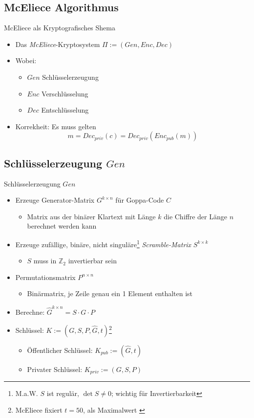 \documentclass[11pt%
,aspectratio=169%
]{beamer}
\begin{document}
\subsection{McEliece Algorithmus}
\begin{frame}{McEliece als Kryptografisches Shema}
    \begin{itemize}
        \item Das \emph{McEliece}-Kryptosystem $\Pi := (Gen, Enc, Dec)$
        \item Wobei:
        \begin{itemize}
            \item $Gen$ Schlüsselerzeugung
            \item $Enc$ Verschlüsselung
            \item $Dec$ Entschlüsselung
        \end{itemize}
        \item Korrekheit: Es muss gelten
        $$
            m = Dec_{priv}(c) = Dec_{priv} (Enc_{pub}(m))
        $$
    \end{itemize}
\end{frame}

\subsection{Schlüsselerzeugung $Gen$}
\begin{frame}{Schlüsselerzeugung $Gen$}
\begin{itemize}
    \item Erzeuge Generator-Matrix $G^{k \times n}$  für Goppa-Code $C$
    \begin{itemize}
        \item Matrix aus der binärer Klartext mit Länge $k$ die Chiffre der Länge $n$ berechnet werden kann
    \end{itemize}
    \item Erzeuge zufällige, binäre, nicht singuläre\footnote{M.a.W. $S$ ist regulär, $\det S \neq 0$; wichtig für Invertierbarkeit} \emph{Scramble-Matrix} $S^{k \times k}$
    \begin{itemize}
        \item $S$ muss in $\mathbb{Z}_2$ invertierbar sein
    \end{itemize}
    \item Permutationsmatrix $P^{n \times n}$
    \begin{itemize}
        \item Binärmatrix, je Zeile genau ein 1 Element enthalten ist
    \end{itemize}
    \item Berechne: $\hat{G}^{k \times n} = S \cdot G \cdot P$
    \item Schlüssel: $K := (G,S,P,\hat{G},t)$\footnote{McEliece fixiert $t=50$, als Maximalwert \cite{McEliece1978public}}
    \begin{itemize}
        \item Öffentlicher Schlüssel: $K_{pub}:= (\hat{G}, t)$
        \item Privater Schlüssel: $K_{priv} := (G,S,P)$
    \end{itemize}
\end{itemize}
\end{frame}
\end{document}
